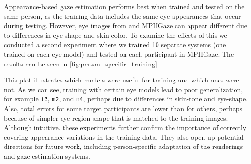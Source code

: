 Appearance-based gaze estimation performs best when trained and tested on the same person, as the training data includes the same eye appearances that occur during testing.
However, eye images from \dataset and MPIIGaze can appear different due to differences in eye-shape and skin color.
To examine the effects of this we conducted a second experiment where we trained 10 separate systems (one trained on each \dataset eye model) and tested on each participant in MPIIGaze.
The results can be seen in \autoref{fig:person_specific_training}.

This plot illustrates which \dataset models were useful for training and which ones were not.
As we can see, training with certain eye models lead to poor generalization, for example \texttt{f3}, \texttt{m2}, and \texttt{m4}, perhaps due to differences in skin-tone and eye-shape.
Also, total errors for some target participants are lower than for others, perhaps because of simpler eye-region shape that is matched to the training images.
Although intuitive, these experiments further confirm the importance of correctly covering appearance variations in the training data.
They also open up potential directions for future work, including person-specific adaptation of the renderings and gaze estimation systems.




